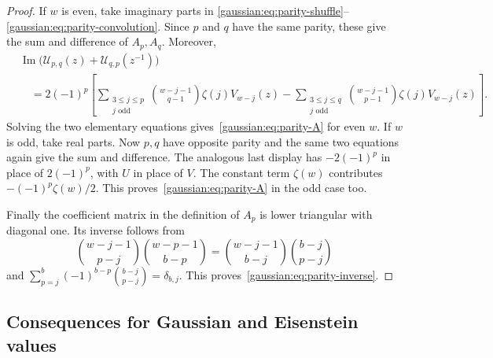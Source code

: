 \begin{proof}
If $w$ is even, take imaginary parts in
\eqref{gaussian:eq:parity-shuffle}--\eqref{gaussian:eq:parity-convolution}. Since $p$ and $q$
have the same parity, these give the sum and difference of $A_p,A_q$.
Moreover,
\begin{align*}
 &\operatorname{Im}\bigl(\mathcal U_{p,q}(z)+
                         \mathcal U_{q,p}(z^{-1})\bigr)\\
 &\quad=2(-1)^p\left[
  \sum_{\substack{3\le j\le p\\j\text{ odd}}}
       \binom{w-j-1}{q-1}\zeta(j)V_{w-j}(z)
 -\sum_{\substack{3\le j\le q\\j\text{ odd}}}
       \binom{w-j-1}{p-1}\zeta(j)V_{w-j}(z)\right].
\end{align*}
Solving the two elementary equations gives~\eqref{gaussian:eq:parity-A} for even
$w$. If $w$ is odd, take real parts. Now $p,q$ have opposite parity and
the same two equations again give the sum and difference. The analogous
last display has $-2(-1)^p$ in place of $2(-1)^p$, with $U$ in place of
$V$. The constant term $\zeta(w)$ contributes
$-(-1)^p\zeta(w)/2$. This proves~\eqref{gaussian:eq:parity-A} in the odd case too.

Finally the coefficient matrix in the definition of $A_p$ is lower
triangular with diagonal one. Its inverse follows from
\[
 \binom{w-j-1}{p-j}\binom{w-p-1}{b-p}
 =\binom{w-j-1}{b-j}\binom{b-j}{p-j}
\]
and $\sum_{p=j}^{b}(-1)^{b-p}\binom{b-j}{p-j}=\delta_{b,j}$.
This proves~\eqref{gaussian:eq:parity-inverse}.
\end{proof}

\subsection{Consequences for Gaussian and Eisenstein values}
\label{gaussian:subsec:gaussian-doubles}


